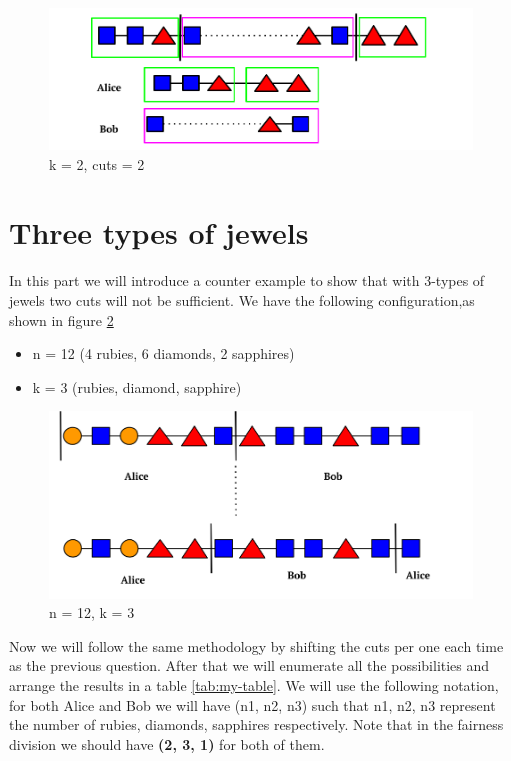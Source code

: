 \documentclass[a4paper,10pt]{article}
\begin{document}
\begin{figure}[H]
  \centering
\includegraphics[scale=.35]{k = 2, cuts = 2.png}
\caption{k = 2, cuts = 2}
\label{3}
\end{figure}



\section{Three types of jewels}

In this part we will introduce a counter example to show that with 3-types of jewels two cuts will not be sufficient. We have the following configuration,as shown in figure \ref{4}
\begin{itemize}
    \item n = 12 (4 rubies, 6 diamonds, 2 sapphires)
    \item k = 3 (rubies, diamond, sapphire)
\end{itemize}
\begin{figure}[H]
  \centering
\includegraphics[scale=.35]{k=3.png}
\caption{n = 12, k = 3}
\label{4}
\end{figure}

Now we will follow the same methodology by shifting the cuts per one each time as the previous question. After that we will enumerate all the possibilities and arrange the results in a table \ref{tab:my-table}. We will use the following notation, for both Alice and Bob we will have (n1, n2, n3) such that n1, n2, n3 represent the number of rubies, diamonds, sapphires respectively. Note that in the fairness division we should have \textbf{(2, 3, 1)} for both of them.
\end{document}
